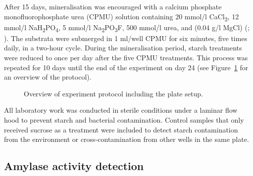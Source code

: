\documentclass[
  b5paper,
]{book}
\begin{document}
After 15 days, mineralisation was encouraged with a calcium phosphate
monofluorophosphate urea (CPMU) solution containing 20 mmol/l
CaCl\textsubscript{2}, 12 mmol/l
NaH\textsubscript{2}PO\textsubscript{4}, 5 mmol/l
Na\textsubscript{2}PO\textsubscript{3}F, 500 mmol/l urea, and (0.04 g/l
MgCl) (; ). The substrata were submerged in 1 ml/well CPMU for six minutes,
five times daily, in a two-hour cycle. During the mineralisation period,
starch treatments were reduced to once per day after the five CPMU
treatments. This process was repeated for 10 days until the end of the
experiment on day 24 (see Figure~\ref{fig-protocol} for an overview of
the protocol).

\begin{figure}[H]


\caption{\label{fig-protocol}Overview of experiment protocol including
the plate setup.}

\end{figure}%

All laboratory work was conducted in sterile conditions under a laminar
flow hood to prevent starch and bacterial contamination. Control samples
that only received sucrose as a treatment were included to detect starch
contamination from the environment or cross-contamination from other
wells in the same plate.

\subsection{Amylase activity
detection}\label{amylase-activity-detection}
\end{document}
